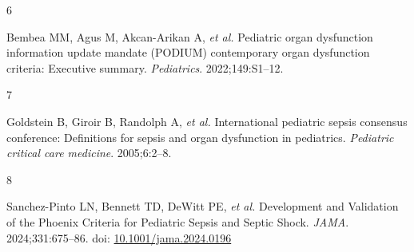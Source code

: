 \documentclass[
  letterpaper,
  DIV=11,
  numbers=noendperiod]{scrartcl}
\newlength{\cslhangindent}
\newlength{\csllabelwidth}
\newenvironment{CSLReferences}[2] %
 {\begin{list}{}{%
  \setlength{\itemindent}{0pt}
  \setlength{\leftmargin}{0pt}
  \setlength{\parsep}{0pt}
  \ifodd #1
   \setlength{\leftmargin}{\cslhangindent}
   \setlength{\itemindent}{-1\cslhangindent}
  \fi
  \setlength{\itemsep}{#2\baselineskip}}}
 {\end{list}}
\newcommand{\CSLLeftMargin}[1]{\parbox[t]{\csllabelwidth}{\strut#1\strut}}
\newcommand{\CSLRightInline}[1]{\parbox[t]{\linewidth - \csllabelwidth}{\strut#1\strut}}
\providecommand{\DIFaddbegin}{} %
\providecommand{\DIFaddend}{} %
\providecommand{\DIFdelbegin}{} %
\providecommand{\DIFdelend}{} %
\newcommand{\DIFscaledelfig}{0.5}
\newlength{\DIFdelgraphicswidth} %
\newlength{\DIFdelgraphicsheight} %
\newcommand{\DIFaddincludegraphics}[2][]{{\color{blue}\fbox{\DIFOincludegraphics[#1]{#2}}}} %
\newcommand{\DIFdelincludegraphics}[2][]{%
\sbox{\DIFdelgraphicsbox}{\DIFOincludegraphics[#1]{#2}}%
\settoboxwidth{\DIFdelgraphicswidth}{\DIFdelgraphicsbox} %
\settoboxtotalheight{\DIFdelgraphicsheight}{\DIFdelgraphicsbox} %
\scalebox{\DIFscaledelfig}{%
\parbox[b]{\DIFdelgraphicswidth}{\usebox{\DIFdelgraphicsbox}\\[-\baselineskip] \rule{\DIFdelgraphicswidth}{0em}}\llap{\resizebox{\DIFdelgraphicswidth}{\DIFdelgraphicsheight}{%
\setlength{\unitlength}{\DIFdelgraphicswidth}%
\begin{picture}(1,1)%
\thicklines\linethickness{2pt} %
{\color[rgb]{1,0,0}\put(0,0){\framebox(1,1){}}}%
{\color[rgb]{1,0,0}\put(0,0){\line( 1,1){1}}}%
{\color[rgb]{1,0,0}\put(0,1){\line(1,-1){1}}}%
\end{picture}%
}\hspace*{3pt}}} %
} %
\DeclareRobustCommand{\DIFaddbegin}{\DIFOaddbegin \let\includegraphics\DIFaddincludegraphics} %
\DeclareRobustCommand{\DIFaddend}{\DIFOaddend \let\includegraphics\DIFOincludegraphics} %
\DeclareRobustCommand{\DIFdelbegin}{\DIFOdelbegin \let\includegraphics\DIFdelincludegraphics} %
\DeclareRobustCommand{\DIFdelend}{\DIFOaddend \let\includegraphics\DIFOincludegraphics} %
\begin{document}
\begin{CSLReferences}{0}{1}
\CSLLeftMargin{6 }%
\CSLRightInline{Bembea MM, Agus M, Akcan-Arikan A, \emph{et al.}
Pediatric organ dysfunction information update mandate (PODIUM)
contemporary organ dysfunction criteria: Executive summary.
\emph{Pediatrics}. 2022;149:S1--12.}

\CSLLeftMargin{7 }%
\CSLRightInline{Goldstein B, Giroir B, Randolph A, \emph{et al.}
International pediatric sepsis consensus conference: Definitions for
sepsis and organ dysfunction in pediatrics. \emph{Pediatric critical
care medicine}. 2005;6:2--8.}

\CSLLeftMargin{8 }%
\DIFdelbegin %
\DIFdelend \DIFaddbegin \CSLRightInline{Sanchez-Pinto LN, Bennett TD, DeWitt PE, \emph{et al.}
{Development and Validation of the Phoenix Criteria for Pediatric Sepsis
and Septic Shock}. \emph{JAMA}. 2024;331:675--86. doi:
\href{https://doi.org/10.1001/jama.2024.0196}{10.1001/jama.2024.0196}}
\DIFaddend 

\end{CSLReferences}
\end{document}
